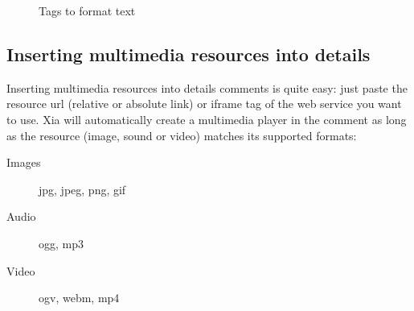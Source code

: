 \begin{figure}[htp!]
\caption{Tags to format text}
\label{xia_text_tags}
\end{figure}

\newpage

\subsection{Inserting multimedia resources into details}\label{enrichissement_multimedia}

Inserting multimedia resources into details comments is quite easy: just paste 
the resource url (relative or absolute link) or iframe tag of the web service 
you want to use. Xia will automatically create a multimedia player in the comment as long as 
the resource (image, sound or video) matches its supported formats: 
\begin{description}
 \item [Images] jpg, jpeg, png, gif
 \item [Audio] ogg, mp3
 \item [Video] ogv, webm, mp4
\end{description}

